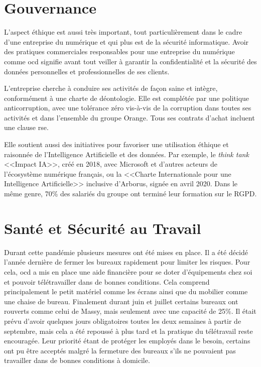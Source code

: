 \documentclass[12pt, oneside, a4paper, titlepage]{report}
\begin{document}
\section{Gouvernance}%
\label{sec:rse::gouv}

L'aspect éthique est aussi très important, tout particulièrement dans le cadre
d'une entreprise du numérique et qui plus est de la sécurité informatique. Avoir
des pratiques commerciales responsables pour une entreprise du numérique comme
\acrlong{ocd} signifie avant tout veiller à garantir la confidentialité et la
sécurité des données personnelles et professionnelles de ses clients.

L'entreprise cherche à conduire ses activités de façon saine et intègre,
conformément à une charte de déontologie. Elle est complétée par une politique
anticorruption, avec une tolérance zéro vis-à-vis de la corruption dans toutes
ses activités et dans l'ensemble du groupe Orange. Tous ses contrats d'achat
incluent une clause \gls{rse}.

Elle soutient aussi des initiatives pour favoriser une utilisation éthique et
raisonnée de l'Intelligence Artificielle et des données. Par exemple, le
\textit{think tank} <<Impact IA>>, créé en 2018, avec Microsoft et d'autres
acteurs de l'écosystème numérique français, ou la <<Charte Internationale pour
une Intelligence Artificielle>> inclusive d'Arborus, signée en avril 2020. Dans
le même genre, 70\% des salariés du groupe ont terminé leur formation sur le
RGPD\@.

\section{Santé et Sécurité au Travail}%
\label{sec:rse::sst}

Durant cette pandémie plusieurs mesures ont été mises en place. Il a été décidé
l'année dernière de fermer les bureaux rapidement pour limiter les risques. Pour
cela, \gls{ocd} a mis en place une aide financière pour se doter d'équipements
chez soi et pouvoir télétravailler dans de bonnes conditions. Cela comprend
principalement le petit matériel comme les écrans ainsi que du mobilier comme
une chaise de bureau.  Finalement durant juin et juillet certains bureaux ont
rouverts comme celui de Massy, mais seulement avec une capacité de 25\%. Il
était prévu d'avoir quelques jours obligatoires toutes les deux semaines à
partir de septembre, mais cela a été repoussé à plus tard et la pratique du
télétravail reste encouragée. Leur priorité étant de protéger les employés dans
le besoin, certains ont pu être acceptés malgré la fermeture des bureaux s'ils
ne pouvaient pas travailler dans de bonnes conditions à domicile.
\end{document}
